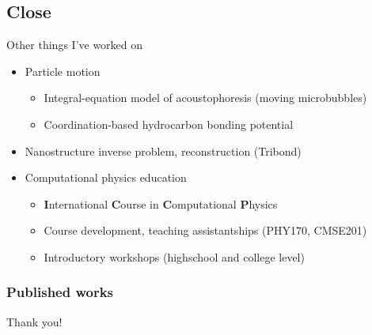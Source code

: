 \documentclass[aspectratio=169, usenames, dvipsnames]{beamer}
\begin{document}
\subsection{Close}

\begin{frame}{Other things I've worked on}
  \begin{itemize}
    \item[] Particle motion
      \begin{itemize}
        \item Integral-equation model of acoustophoresis (moving microbubbles)
        \item Coordination-based hydrocarbon bonding potential
      \end{itemize}
    \item[] Nanostructure inverse problem, reconstruction (Tribond)
    \item[] Computational physics education
      \begin{itemize}
        \item \textbf{I}nternational \textbf{C}ourse in \textbf{C}omputational \textbf{P}hysics
        \item Course development, teaching assistantships (PHY170, CMSE201)
        \item Introductory workshops (highschool and college level)
      \end{itemize}
  \end{itemize}
\end{frame}

\begin{frame}[t, allowframebreaks]
  \frametitle{Published works}
  \nocite{*}
  
  
\end{frame}

\begin{frame}[standout]
  Thank you! 
\end{frame}

\appendix
\end{document}
